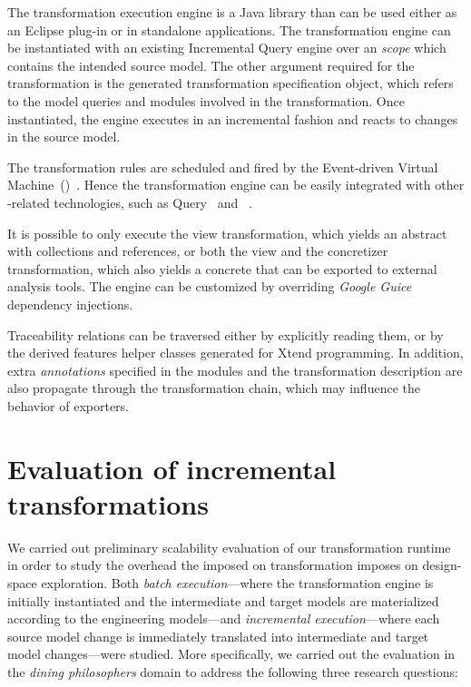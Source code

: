 The transformation execution engine is a Java library than can be used either as an Eclipse plug-in or in standalone applications. The transformation engine can be instantiated with an existing  Incremental Query engine over an \textit{ scope} which contains the intended source model. The other argument required for the transformation is the generated transformation specification object, which refers to the  model queries and  modules involved in the transformation. Once instantiated, the engine executes in an incremental fashion and reacts to changes in the source model.

The transformation rules are scheduled and fired by the  Event-driven Virtual Machine~()~\citep{Bergmann15viatra}. Hence the transformation engine can be easily integrated with other -related technologies, such as  Query~\citep{Ujhelyi15incquery} and ~\citep{Abdeen14multiobjective}.

It is possible to only execute the view transformation, which yields an abstract  with collections and references, or both the view and the concretizer transformation, which also yields a concrete  that can be exported to external analysis tools. The engine can be customized by overriding \emph{Google Guice} dependency injections.

Traceability relations can be traversed either by explicitly reading them, or by the derived features helper classes generated for Xtend programming. In addition, extra \emph{annotations} specified in the  modules and the transformation description are also propagate through the transformation chain, which may influence the behavior of  exporters.

\section{Evaluation of incremental transformations}
\label{sec:apply:eval}

We carried out preliminary scalability evaluation of our transformation runtime in order to study the overhead the imposed on transformation imposes on design-space exploration. Both \emph{batch execution}---where the transformation engine is initially instantiated and the intermediate and target  models are materialized according to the engineering models---and \emph{incremental execution}---where each source model change is immediately translated into intermediate and target model changes---were studied. More specifically, we carried out the evaluation in the \emph{dining philosophers} domain to address the following three research questions:
